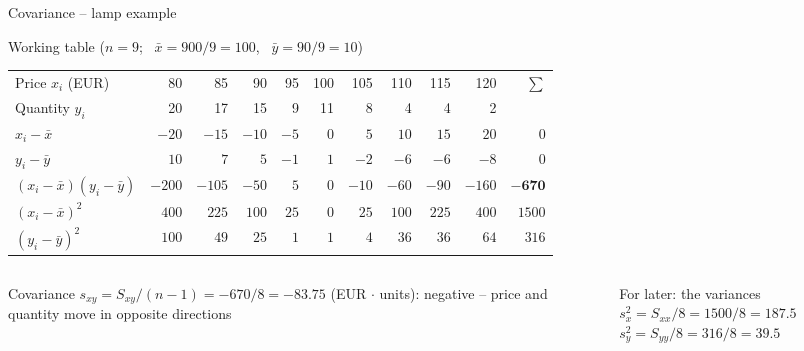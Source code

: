 \documentclass[aspectratio=169,11pt]{beamer}
\begin{document}
\begin{frame}{Covariance -- lamp example}
  \begin{block}{Working table ($n = 9$; \ $\bar{x} = 900/9 = 100$, \ $\bar{y} = 90/9 = 10$)}
    \begin{center}
      \footnotesize
      \renewcommand{\arraystretch}{0.95}
      \begin{tabular}{l*{9}{r}r}
        \toprule
        Price $x_i$ (EUR)            & 80     & 85     & 90    & 95   & 100 & 105   & 110   & 115   & 120    & $\sum$ \\
        Quantity $y_i$               & 20     & 17     & 15    & 9    & 11  & 8     & 4     & 4     & 2      & \\
        \midrule
        $x_i - \bar{x}$              & $-20$  & $-15$  & $-10$ & $-5$ & $0$ & $5$   & $10$  & $15$  & $20$   & $0$ \\
        $y_i - \bar{y}$              & $10$   & $7$    & $5$   & $-1$ & $1$ & $-2$  & $-6$  & $-6$  & $-8$   & $0$ \\
        $(x_i-\bar{x})(y_i-\bar{y})$ & $-200$ & $-105$ & $-50$ & $5$  & $0$ & $-10$ & $-60$ & $-90$ & $-160$ & $\mathbf{-670}$ \\
        \midrule
        $(x_i-\bar{x})^{2}$          & $400$  & $225$  & $100$ & $25$ & $0$ & $25$  & $100$ & $225$ & $400$  & $1500$ \\
        $(y_i-\bar{y})^{2}$          & $100$  & $49$   & $25$  & $1$  & $1$ & $4$   & $36$  & $36$  & $64$   & $316$ \\
        \bottomrule
      \end{tabular}
    \end{center}
  \end{block}
  \begin{columns}[T]
    \begin{column}{0.54\textwidth}
      \begin{exampleblock}{Covariance}
        $s_{xy} = S_{xy}/(n - 1) = -670/8 = \mathbf{-83.75}$ (EUR $\cdot$ units):
        negative -- price and quantity move in opposite directions
      \end{exampleblock}
    \end{column}
    \begin{column}{0.44\textwidth}
      \begin{block}{For later: the variances}
        $s_x^{2} = S_{xx}/8 = 1500/8 = 187.5$\\[2pt]
        $s_y^{2} = S_{yy}/8 = 316/8 = 39.5$
      \end{block}
    \end{column}
  \end{columns}
\end{frame}
\end{document}
